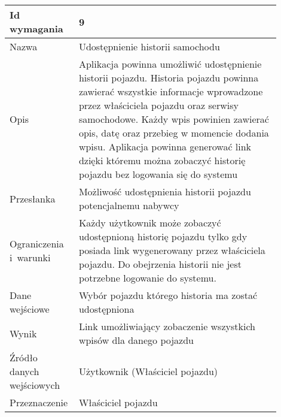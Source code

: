 \documentclass[12pt]{article}
\begin{document}
\begin{table}[H]
\begin{center}
	\begin{tabular}{|p{0.18\linewidth}|p{0.72\linewidth}|}%
	\hline
	Id wymagania 	& 9 				\\ \hline
	Nazwa			& Udostępnienie historii samochodu
 \\ \hline
	Opis &
	Aplikacja powinna umożliwić udostępnienie historii pojazdu. Historia pojazdu powinna zawierać wszystkie informacje wprowadzone przez właściciela pojazdu oraz serwisy samochodowe. Każdy wpis powinien zawierać opis, datę oraz przebieg w momencie dodania wpisu. Aplikacja powinna generować link dzięki któremu można zobaczyć historię pojazdu bez logowania się do systemu 


\\ \hline
	Przesłanka & 

Możliwość udostępnienia historii pojazdu potencjalnemu nabywcy 

  \\ \hline
	Ograniczenia i~warunki & 

Każdy użytkownik może zobaczyć udostępnioną historię pojazdu tylko gdy posiada link wygenerowany przez właściciela pojazdu. Do obejrzenia historii nie jest potrzebne logowanie do systemu.


 \\ \hline
	Dane wejściowe &

Wybór pojazdu którego historia ma zostać udostępniona


 \\ \hline
	Wynik & 

Link umożliwiający zobaczenie wszystkich wpisów dla danego pojazdu


\\ \hline
	Źródło danych wejściowych &

Użytkownik (Właściciel pojazdu)


\\ \hline

	Przeznaczenie & 
	
Właściciel pojazdu

\\ \hline
	\end{tabular}
\end{center}
\end{table}
\end{document}
